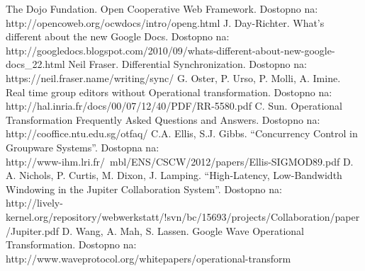 \documentclass[a4paper, 12pt, twoside]{book}
\begin{document}
\begin{thebibliography}{99}
 The Dojo Fundation. Open Cooperative Web Framework. Dostopno na:\\ http://opencoweb.org/ocwdocs/intro/openg.html
 J. Day-Richter. What’s different about the new Google Docs. Dostopno na:\\ http://googledocs.blogspot.com/2010/09/whats-different-about-new-google-docs\_22.html
 Neil Fraser. Differential Synchronization. Dostopno na:\\ https://neil.fraser.name/writing/sync/
 G. Oster, P. Urso, P. Molli, A. Imine. Real time group editors without Operational transformation. Dostopno na:\\ http://hal.inria.fr/docs/00/07/12/40/PDF/RR-5580.pdf
 C. Sun. Operational Transformation Frequently Asked Questions and Answers. Dostopno na:\\ http://cooffice.ntu.edu.sg/otfaq/
 C.A. Ellis, S.J. Gibbs. “Concurrency Control in Groupware Systems”. Dostopna na:\\ http://www-ihm.lri.fr/~mbl/ENS/CSCW/2012/papers/Ellis-SIGMOD89.pdf
 D. A. Nichols, P. Curtis, M. Dixon, J. Lamping. “High-Latency, Low-Bandwidth Windowing in the Jupiter Collaboration System”. Dostopno na:\\ http://lively-kernel.org/repository/webwerkstatt/!svn/bc/15693/projects/Collaboration/paper/Jupiter.pdf
 D. Wang, A. Mah, S. Lassen. Google Wave Operational Transformation. Dostopno na:\\ http://www.waveprotocol.org/whitepapers/operational-transform
\end{thebibliography}

\end{document}
